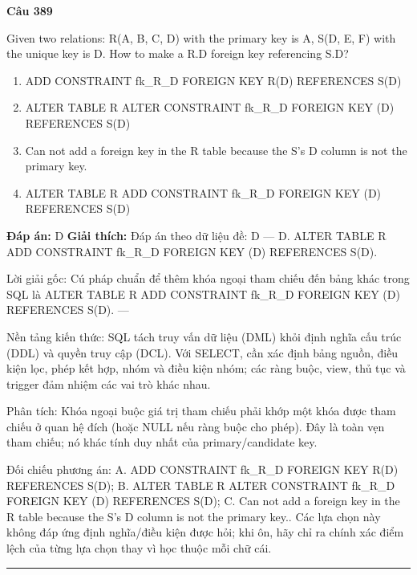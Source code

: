 \documentclass[11pt,a4paper]{article}
\newenvironment{question}[1]{%
  \par\vspace{1em}\noindent\textbf{\large Câu #1}\par\vspace{0.4em}
}{%
  \par\vspace{1em}\hrule\vspace{0.6em}
}
\newenvironment{choices}{%
  \begin{enumerate}[label=\textbf{\Alph*.},leftmargin=2.2em,itemsep=2pt,topsep=3pt]
}{%
  \end{enumerate}
}
\newcommand{\choice}{\item}
\begin{document}
\begin{question}{389}
Given two relations: R(A, B, C, D) with the primary key is A, S(D, E, F) with the unique key is D. How to make a R.D foreign key referencing S.D?
\begin{choices}
\choice ADD CONSTRAINT fk_R_D FOREIGN KEY R(D) REFERENCES S(D)
\choice ALTER TABLE R ALTER CONSTRAINT fk_R_D FOREIGN KEY (D) REFERENCES S(D)
\choice Can not add a foreign key in the R table because the S's D column is not the primary key.
\choice ALTER TABLE R ADD CONSTRAINT fk_R_D FOREIGN KEY (D) REFERENCES S(D)
\end{choices}
\textbf{Đáp án:} D
\textbf{Giải thích:} Đáp án theo dữ liệu đề: D — D. ALTER TABLE R ADD CONSTRAINT fk_R_D FOREIGN KEY (D) REFERENCES S(D).

Lời giải gốc: Cú pháp chuẩn để thêm khóa ngoại tham chiếu đến bảng khác trong SQL là ALTER TABLE R ADD CONSTRAINT fk_R_D FOREIGN KEY (D) REFERENCES S(D). ---

Nền tảng kiến thức: SQL tách truy vấn dữ liệu (DML) khỏi định nghĩa cấu trúc (DDL) và quyền truy cập (DCL). Với SELECT, cần xác định bảng nguồn, điều kiện lọc, phép kết hợp, nhóm và điều kiện nhóm; các ràng buộc, view, thủ tục và trigger đảm nhiệm các vai trò khác nhau.

Phân tích: Khóa ngoại buộc giá trị tham chiếu phải khớp một khóa được tham chiếu ở quan hệ đích (hoặc NULL nếu ràng buộc cho phép). Đây là toàn vẹn tham chiếu; nó khác tính duy nhất của primary/candidate key.

Đối chiếu phương án: A. ADD CONSTRAINT fk_R_D FOREIGN KEY R(D) REFERENCES S(D); B. ALTER TABLE R ALTER CONSTRAINT fk_R_D FOREIGN KEY (D) REFERENCES S(D); C. Can not add a foreign key in the R table because the S's D column is not the primary key.. Các lựa chọn này không đáp ứng định nghĩa/điều kiện được hỏi; khi ôn, hãy chỉ ra chính xác điểm lệch của từng lựa chọn thay vì học thuộc mỗi chữ cái.
\end{question}
\end{document}
